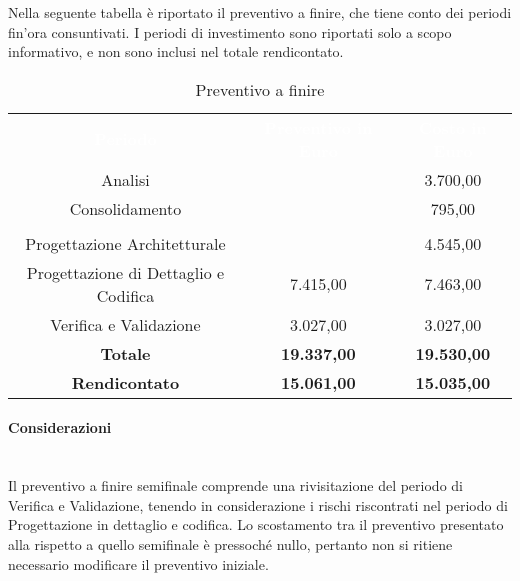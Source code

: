 Nella seguente tabella è riportato il preventivo a finire, che tiene conto dei periodi fin'ora consuntivati. I periodi di investimento sono riportati solo a scopo informativo, e non sono inclusi nel totale rendicontato.

\begin{table}[H]
	\centering
	\begin{tabular}{ccc}
	\rowcolor{greySWEight}
	\textcolor{white}{\textbf{Periodo}} &
	\textcolor{white}{\textbf{Preventivo in Euro}} & 
	\textcolor{white}{\textbf{Costo in Euro}} \\
	Analisi &  & 3.700,00 \\
	Consolidamento &  & 795,00 \\
	\rowcolor{greySWEight}
	\multicolumn{3}{c}{ \textcolor{white}{\textbf{Rendicontato}} } \\
		Progettazione Architetturale & & 4.545,00 \\
		Progettazione di Dettaglio e Codifica & 7.415,00 & 7.463,00 \\
		Verifica e Validazione & 3.027,00 & 3.027,00 \\
		\textbf{Totale} & \textbf{19.337,00} & \textbf{19.530,00} \\
		\textbf{Rendicontato} & \textbf{15.061,00} & \textbf{15.035,00} \\
	\end{tabular}
	\caption{Preventivo a finire}
\end{table}
\paragraph{Considerazioni}\mbox{}\\
Il preventivo a finire semifinale comprende una rivisitazione del periodo di Verifica e Validazione, tenendo in considerazione i rischi riscontrati nel periodo di Progettazione in dettaglio e codifica. Lo scostamento tra il preventivo presentato alla \RR{} rispetto a quello semifinale è pressoché nullo, pertanto non si ritiene necessario modificare il preventivo iniziale. 